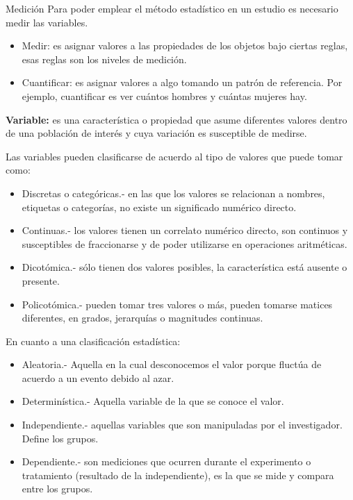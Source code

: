 Medici\'on Para poder emplear el m\'etodo estad\'istico en un estudio es necesario medir las variables. 

\begin{itemize}
    \item Medir: es asignar valores a las propiedades de los objetos bajo ciertas reglas, esas reglas son los niveles de medici\'on.
    \item Cuantificar: es asignar valores a algo tomando un patr\'on de referencia. Por ejemplo, cuantificar es ver cu\'antos hombres y cu\'antas mujeres hay.
\end{itemize}

\textbf{Variable:} es una caracter\'istica o propiedad que asume diferentes valores dentro de una poblaci\'on de inter\'es y cuya variaci\'on es susceptible de medirse.

Las variables pueden clasificarse de acuerdo al tipo de valores que puede tomar como:

\begin{itemize}
    \item Discretas o categ\'oricas.- en las que los valores se relacionan a nombres, etiquetas o categor\'ias, no existe un significado num\'erico directo.
    \item Continuas.- los valores tienen un correlato num\'erico directo, son continuos y susceptibles de fraccionarse y de poder utilizarse en operaciones aritm\'eticas.
    \item Dicot\'omica.- s\'olo tienen dos valores posibles, la caracter\'istica est\'a ausente o presente.
    \item Policot\'omica.- pueden tomar tres valores o m\'as, pueden tomarse matices diferentes, en grados, jerarqu\'ias o magnitudes continuas.
\end{itemize}

En cuanto a una clasificaci\'on estad\'istica:

\begin{itemize}
    \item Aleatoria.- Aquella en la cual desconocemos el valor porque fluct\'ua de acuerdo a un evento debido al azar.
    \item Determin\'istica.- Aquella variable de la que se conoce el valor.
    \item Independiente.- aquellas variables que son manipuladas por el investigador. Define los grupos.
    \item Dependiente.- son mediciones que ocurren durante el experimento o tratamiento (resultado de la independiente), es la que se mide y compara entre los grupos.
\end{itemize}

